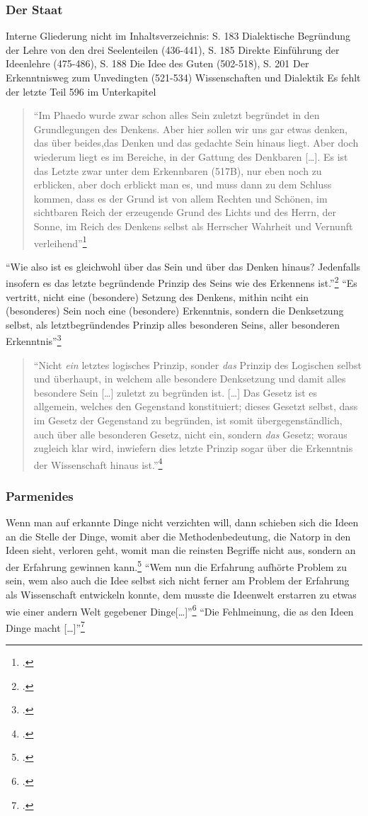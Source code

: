 \documentclass[12pt]{article}
\newcommand*{\zitatblock}[1]{%
    \begin{quote}
    \fontsize{10}{12}\selectfont
    \setlength{\parskip}{1.0em}
    #1
    \end{quote}
}
\begin{document}
\subsubsection*{Der Staat}
Interne Gliederung nicht im Inhaltsverzeichnis: S. 183 Dialektische Begründung der Lehre von den drei Seelenteilen (436-441), S. 185 Direkte Einführung der Ideenlehre (475-486), S. 188 Die Idee des Guten (502-518), S. 201 Der Erkenntnisweg zum Unvedingten (521-534) Wissenschaften und Dialektik
Es fehlt der letzte Teil 596 im Unterkapitel
\zitatblock{\enquote{Im Phaedo wurde zwar schon alles Sein zuletzt begründet in den Grundlegungen des Denkens. Aber hier sollen wir uns gar etwas denken, das über beides,das Denken und das gedachte Sein hinaus liegt. Aber doch wiederum liegt es im Bereiche, in der Gattung des Denkbaren [\dots]. Es ist das Letzte zwar unter dem Erkennbaren (517B), nur eben noch zu erblicken, aber doch erblickt man es, und muss dann zu dem Schluss kommen, dass es der Grund ist von allem Rechten und Schönen, im sichtbaren Reich der erzeugende Grund des Lichts und des Herrn, der Sonne, im Reich des Denkens selbst als Herrscher Wahrheit und Vernunft verleihend}\footcite[][S. 191]{NatorpIdeenlehre}}
\enquote{Wie also ist es gleichwohl über das Sein und über das Denken hinaus? Jedenfalls insofern es das letzte begründende Prinzip des Seins wie des Erkennens ist.}\footcite[][S. 191]{NatorpIdeenlehre}
\enquote{Es vertritt, nicht eine (besondere) Setzung des Denkens, mithin nciht ein (besonderes) Sein noch eine (besondere) Erkenntnis, sondern die Denksetzung selbst, als letztbegründendes Prinzip alles besonderen Seins, aller besonderen Erkenntnis}\footcite[][S. 192]{NatorpIdeenlehre}
\zitatblock{\enquote{Nicht \emph{ein} letztes logisches Prinzip, sonder \emph{das} Prinzip des Logischen selbst und überhaupt, in welchem alle besondere Denksetzung und damit alles besondere Sein [\dots] zuletzt zu begründen ist. [\dots] Das Gesetz ist es allgemein, welches den Gegenstand konstituiert; dieses Gesetzt selbst, dass im Gesetz der Gegenstand zu begründen, ist somit übergegenständlich, auch über alle besonderen Gesetz, nicht ein, sondern \emph{das} Gesetz; woraus zugleich klar wird, inwiefern dies letzte Prinzip sogar über die Erkenntnis der Wissenschaft hinaus ist.}\footcite[vgl.][S. 194f.]{NatorpIdeenlehre}}
\subsubsection*{Parmenides}
Wenn man auf erkannte Dinge nicht verzichten will, dann schieben sich die Ideen an die Stelle der Dinge, womit aber die Methodenbedeutung, die Natorp in den Ideen sieht, verloren geht, womit man die reinsten Begriffe nicht aus, sondern an der Erfahrung gewinnen kann.\footcite[vgl.][S. 222f.]{NatorpIdeenlehre} \enquote{Wem nun die Erfahrung aufhörte Problem zu sein, wem also auch die Idee selbst sich nicht ferner am Problem der Erfahrung als Wissenschaft entwickeln konnte, dem musste die Ideenwelt erstarren zu etwas wie einer andern Welt gegebener Dinge[\dots]}\footcite[vgl.][S. 223]{NatorpIdeenlehre}
\enquote{Die Fehlmeinung, die as den Ideen Dinge macht [\dots]}\footcite[][S. 225]{NatorpIdeenlehre}
\end{document}
